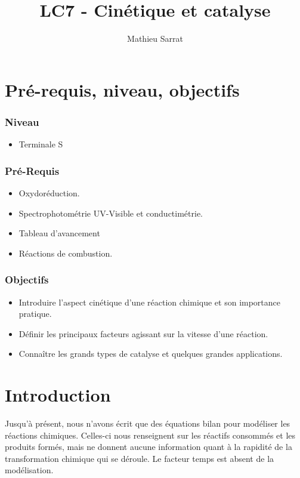 \documentclass[11pt,a4paper]{report}
\author{Mathieu Sarrat}
\title{LC7 - Cinétique et catalyse}
\begin{document}
\maketitle

\section*{Pré-requis, niveau, objectifs}

\subsubsection*{Niveau}
\begin{itemize}
	\item Terminale S
\end{itemize}

\subsubsection*{Pré-Requis}
\begin{itemize}
	\item Oxydoréduction.
	\item Spectrophotométrie UV-Visible et conductimétrie.
	\item Tableau d'avancement
	\item Réactions de combustion.
\end{itemize}

\subsubsection*{Objectifs}
\begin{itemize}
	\item Introduire l'aspect cinétique d'une réaction chimique et son importance pratique.
	\item Définir les principaux facteurs agissant sur la vitesse d'une réaction.
	\item Connaître les grands types de catalyse et quelques grandes applications.
\end{itemize}

\newpage
\section*{Introduction}

Jusqu'à présent, nous n'avons écrit que des équations bilan pour modéliser les réactions chimiques. Celles-ci nous renseignent sur les réactifs consommés et les produits formés, mais ne donnent aucune information quant à la rapidité de la transformation chimique qui se déroule. Le facteur temps est absent de la modélisation.\\
\end{document}
